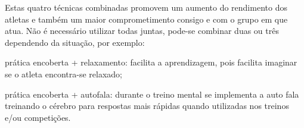 \begin{Desenvolvimento}
Estas quatro técnicas combinadas promovem um aumento do rendimento dos atletas e também um maior comprometimento consigo e com o grupo em que atua. Não é necessário utilizar todas juntas, pode-se combinar duas ou três dependendo da situação, por exemplo:
\begin{alinea}
  \item prática encoberta + relaxamento: facilita a aprendizagem, pois facilita imaginar se o atleta encontra-se relaxado;
  \item prática encoberta + autofala: durante o treino mental se implementa a auto fala treinando o cérebro para respostas mais rápidas quando utilizadas nos treinos e/ou competições.
\end{alinea}





\end{Desenvolvimento}


